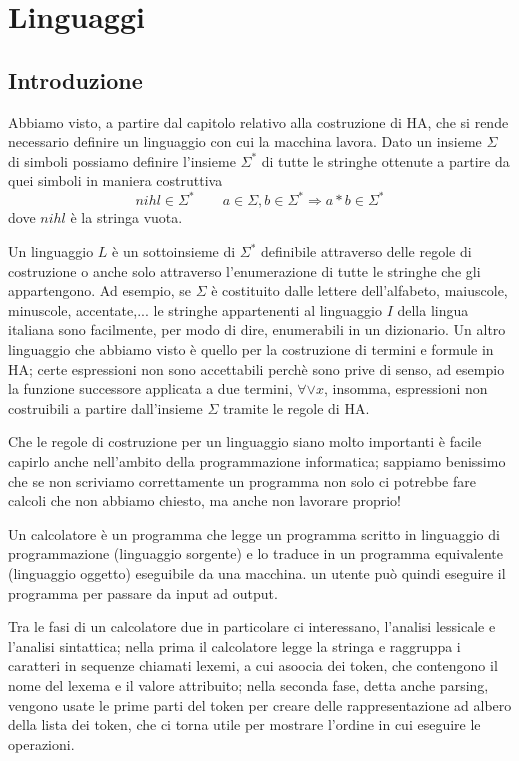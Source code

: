 \chapter{Linguaggi}

\section{Introduzione}
Abbiamo visto, a partire dal capitolo relativo alla costruzione di HA, che si rende necessario 
definire un linguaggio con cui la macchina lavora. Dato un insieme $\Sigma$ di simboli
possiamo definire l'insieme $\Sigma^*$ di tutte le stringhe ottenute a partire da quei
simboli in maniera costruttiva
\[ nihl\in\Sigma^*\qquad a\in\Sigma , b\in\Sigma^*\Rightarrow a*b\in\Sigma^* \]
dove $nihl$ è la stringa vuota.

Un linguaggio $L$ è un sottoinsieme di $\Sigma^*$ definibile attraverso delle regole di
costruzione o anche solo attraverso l'enumerazione di tutte le stringhe che gli appartengono.
Ad esempio, se $\Sigma$ è costituito dalle lettere dell'alfabeto, maiuscole, minuscole, accentate,...
le stringhe appartenenti al linguaggio $I$ della lingua italiana sono facilmente, per modo di dire,
enumerabili in un dizionario. Un altro linguaggio che abbiamo visto è quello per la costruzione di
termini e formule in HA; certe espressioni non sono accettabili perchè sono prive di senso, ad esempio
la funzione successore applicata a due termini, $\forall\vee x$, insomma, espressioni non costruibili 
a partire dall'insieme $\Sigma$ tramite le regole di HA.

Che le regole di costruzione per un linguaggio siano molto importanti è facile capirlo anche
nell'ambito della programmazione informatica; sappiamo benissimo che se non scriviamo correttamente
un programma non solo ci potrebbe fare calcoli che non abbiamo chiesto, ma anche non lavorare proprio!

Un calcolatore è un programma che legge un programma scritto in linguaggio di programmazione (linguaggio
sorgente) e lo traduce in un programma equivalente (linguaggio oggetto) eseguibile da una macchina.
un utente può quindi eseguire il programma per passare da input ad output.

Tra le fasi di un calcolatore due in particolare ci interessano, l'analisi lessicale e l'analisi sintattica; nella prima
il calcolatore legge la stringa e raggruppa i caratteri in sequenze chiamati lexemi, a cui asoocia dei token, che 
contengono il nome del lexema e il valore attribuito; nella seconda fase, detta anche parsing, vengono usate le
prime parti del token per creare delle rappresentazione ad albero della lista dei token, che ci torna utile per
mostrare l'ordine in cui eseguire le operazioni.

